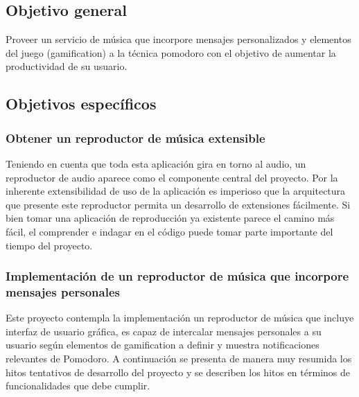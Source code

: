 \documentclass[12pt,letterpaper]{report}
\begin{document}
\hypertarget{objetivo-general}{%
\subsection{Objetivo general}\label{objetivo-general}}

Proveer un servicio de música que incorpore mensajes personalizados y
elementos del juego (gamification) a la técnica pomodoro con el objetivo
de aumentar la productividad de su usuario.

\hypertarget{objetivos-especuxedficos}{%
\subsection{Objetivos específicos}\label{objetivos-especuxedficos}}

\hypertarget{obtener-un-reproductor-de-muxfasica-extensible}{%
\subsubsection{Obtener un reproductor de música
extensible}\label{obtener-un-reproductor-de-muxfasica-extensible}}

Teniendo en cuenta que toda esta aplicación gira en torno al audio, un
reproductor de audio aparece como el componente central del proyecto.
Por la inherente extensibilidad de uso de la aplicación es imperioso que
la arquitectura que presente este reproductor permita un desarrollo de
extensiones fácilmente. Si bien tomar una aplicación de reproducción ya
existente parece el camino más fácil, el comprender e indagar en el
código puede tomar parte importante del tiempo del proyecto.

\hypertarget{implementaciuxf3n-de-un-reproductor-de-muxfasica-que-incorpore-mensajes-dirigidos}{%
\subsubsection{Implementación de un reproductor de música que incorpore
mensajes
personales}\label{implementaciuxf3n-de-un-reproductor-de-muxfasica-que-incorpore-mensajes-dirigidos}}

Este proyecto contempla la implementación un reproductor de música que
incluye interfaz de usuario gráfica, es capaz de intercalar mensajes
personales a su usuario según elementos de gamification a definir y
muestra notificaciones relevantes de Pomodoro. A continuación se
presenta de manera muy resumida los hitos tentativos de desarrollo del
proyecto y se describen los hitos en términos de funcionalidades que
debe cumplir.
\end{document}
